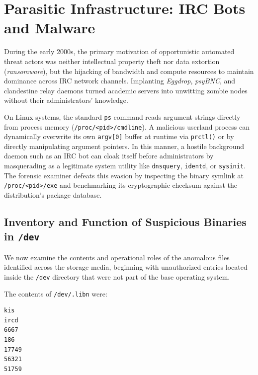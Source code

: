 \chapter{Parasitic Infrastructure: IRC Bots and Malware}

During the early 2000s, the primary motivation of opportunistic automated threat actors was neither intellectual property theft nor data extortion (\textit{ransomware}), but the hijacking of bandwidth and compute resources to maintain dominance across IRC network channels. Implanting \textit{Eggdrop}, \textit{psyBNC}, and clandestine relay daemons turned academic servers into unwitting zombie nodes without their administrators' knowledge.

\begin{notaforense}
On Linux systems, the standard \texttt{ps} command reads argument strings directly from process memory (\texttt{/proc/<pid>/cmdline}). A malicious userland process can dynamically overwrite its own \texttt{argv[0]} buffer at runtime via \texttt{prctl()} or by directly manipulating argument pointers. In this manner, a hostile background daemon such as an IRC bot can cloak itself before administrators by masquerading as a legitimate system utility like \texttt{dnsquery}, \texttt{identd}, or \texttt{sysinit}. The forensic examiner defeats this evasion by inspecting the binary symlink at \texttt{/proc/<pid>/exe} and benchmarking its cryptographic checksum against the distribution's package database.
\end{notaforense}

\section{Inventory and Function of Suspicious Binaries in \texttt{/dev}}

We now examine the contents and operational roles of the anomalous files identified across the storage media, beginning with unauthorized entries located inside the \texttt{/dev} directory that were not part of the base operating system.

The contents of \texttt{/dev/.libn} were:

\vspace{1em}

\begin{lstlisting}[style=terminal]
kis
ircd
6667
186
17749
56321
51759
\end{lstlisting}


